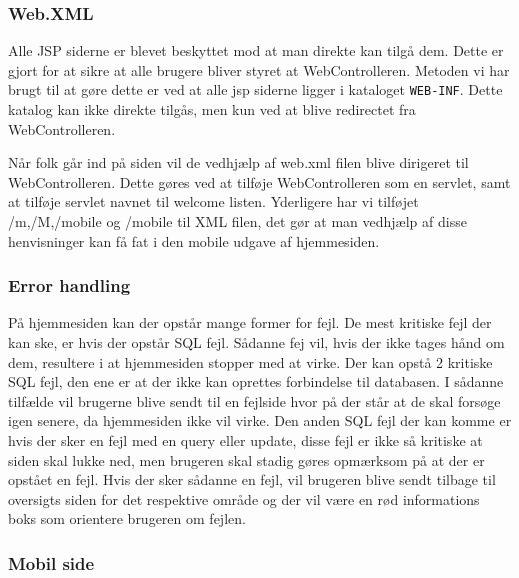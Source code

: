 \documentclass[a4paper]{article}
\begin{document}

\subsubsection*{Web.XML} %

Alle JSP siderne er blevet beskyttet mod at man direkte kan tilgå dem. Dette er gjort for at sikre at alle brugere bliver styret at WebControlleren. Metoden vi har brugt til at gøre dette er ved at alle jsp siderne ligger i kataloget \texttt{WEB-INF}. Dette katalog kan ikke direkte tilgås, men kun ved at blive redirectet fra WebControlleren. 

Når folk går ind på siden vil de vedhjælp af web.xml filen blive dirigeret til WebControlleren. Dette gøres ved at tilføje WebControlleren som en servlet, samt at tilføje servlet navnet til welcome listen. Yderligere har vi tilføjet /m,/M,/mobile og /mobile til XML filen, det gør at man vedhjælp af disse henvisninger kan få fat i den mobile udgave af hjemmesiden.


\subsubsection*{Error handling} %

På hjemmesiden kan der opstår mange former for fejl. De mest kritiske fejl der kan ske, er hvis der opstår SQL fejl. Sådanne fej vil, hvis der ikke tages hånd om dem, resultere i at hjemmesiden stopper med at virke. Der kan opstå 2 kritiske SQL fejl, den ene er at der ikke kan oprettes forbindelse til databasen. I sådanne tilfælde vil brugerne blive sendt til en fejlside hvor på der står at de skal forsøge igen senere, da hjemmesiden ikke vil virke. Den anden SQL fejl der kan komme er hvis der sker en fejl med en query eller update, disse fejl er ikke så kritiske at siden skal lukke ned, men brugeren skal stadig gøres opmærksom på at der er opstået en fejl. Hvis der sker sådanne en fejl, vil brugeren blive sendt tilbage til oversigts siden for det respektive område og der vil være en rød informations boks som orientere brugeren om fejlen.


\subsubsection*{Mobil side} %
\end{document}
